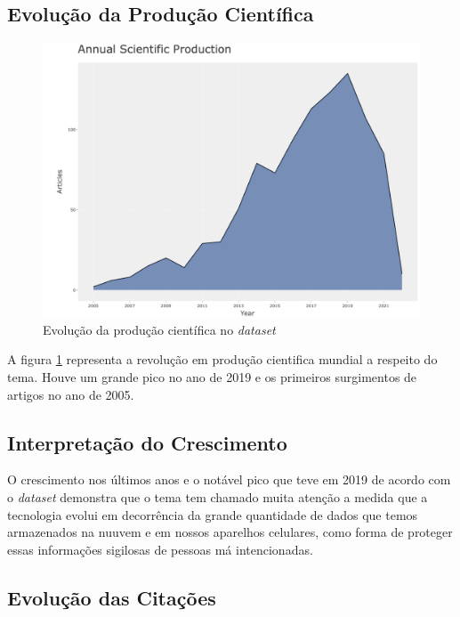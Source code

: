 \subsection{Evolução da Produção Científica}

\begin{figure}
    \centering
    \includegraphics[width=1\textwidth]{experiments/gsmartins96/AnaliseBibliometrica/Malware/Figs/annual_scientific_production.png}
    \caption{Evolução da produção científica no \textit{dataset}}
    \label{fig:evol:anual:MALWARES@gsmartins96}
\end{figure}

A figura \ref{fig:evol:anual:MALWARES@gsmartins96} representa a revolução em produção cientifica mundial a respeito do tema. Houve um grande pico no ano de 2019 e os primeiros surgimentos de artigos no ano de 2005.

\subsection{Interpretação do Crescimento}

O crescimento nos últimos anos e o notável pico que teve em 2019 de acordo com o \textit{dataset} demonstra que o tema tem chamado muita atenção a medida que a tecnologia evolui em decorrência da grande quantidade de dados que temos armazenados na nuuvem e em nossos aparelhos celulares, como forma de proteger essas informações sigilosas de pessoas má intencionadas.

\subsection{Evolução das Citações}


